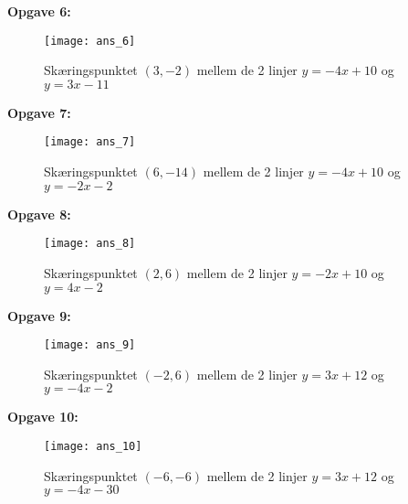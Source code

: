\textbf{Opgave 6:}

\begin{figure}[ht]
\texttt{[image: ans\_6]}
\caption{Skæringspunktet $(3,-2)$ mellem de 2 linjer $y = -4x + 10$ og $y = 3x -11$}
\end{figure}

\newpage

\textbf{Opgave 7:}

\begin{figure}[ht]
\texttt{[image: ans\_7]}
\caption{Skæringspunktet $(6,-14)$ mellem de 2 linjer $y =-4x + 10$ og $y = -2x -2$}
\end{figure}

\textbf{Opgave 8:}

\begin{figure}[ht]
\texttt{[image: ans\_8]}
\caption{Skæringspunktet $(2,6)$ mellem de 2 linjer $y = -2x +10$ og $y = 4x -2$}
\end{figure}

\textbf{Opgave 9:}

\begin{figure}[ht]
\texttt{[image: ans\_9]}
\caption{Skæringspunktet $(-2,6)$ mellem de 2 linjer $y = 3x +12$ og $y = -4x -2$}
\end{figure}

\newpage 

\textbf{Opgave 10:}

\begin{figure}[ht]
\texttt{[image: ans\_10]}
\caption{Skæringspunktet $(-6,-6)$ mellem de 2 linjer $y = 3x +12$ og $y = -4x -30$}
\end{figure}
